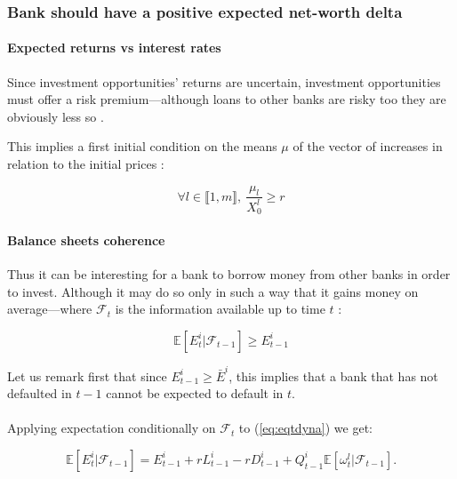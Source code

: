 \documentclass{article}
\begin{document}
\subsubsection{Bank should have a positive expected net-worth delta}\label{expected losers}

\paragraph{Expected returns vs interest rates}
Since investment opportunities' returns are uncertain, investment opportunities must offer a risk premium---although loans to other banks are risky too they are obviously less so . 


This implies a first initial condition on the means $\mu$ of the vector of increases in relation to the initial prices :

    
    $$ \forall l \in \llbracket 1, m \rrbracket,~ \frac{\mu_l}{X_0^l} \geq r $$
    
    
\paragraph{Balance sheets coherence}
Thus it can be interesting for a bank to borrow money from other banks in order to invest. Although it may do so only in such a way that it gains money on average---where $\mathcal{F}_t$ is the information available up to time $t$  :

$$ \mathbb{E}[E_t ^i|\mathcal{F}_{t-1}] \geq E_{t-1}^i $$

Let us remark first that since $E_{t-1}^i \geq \bar{E}^i$, this implies that a bank that has not defaulted in $t-1$ cannot be expected to default in $t$.

\paragraph{}
Applying expectation conditionally on $\mathcal{F}_t$ to (\ref{eq:eqtdyna}) we get: 


$$\mathbb{E}[E_t^i|\mathcal{F}_{t-1}] = E_{t-1}^i + rL_{t-1}^i - rD_{t-1}^i + Q_{t-1}^{i} \mathbb{E}[\omega_t^l|\mathcal{F}_{t-1}].$$
\end{document}
